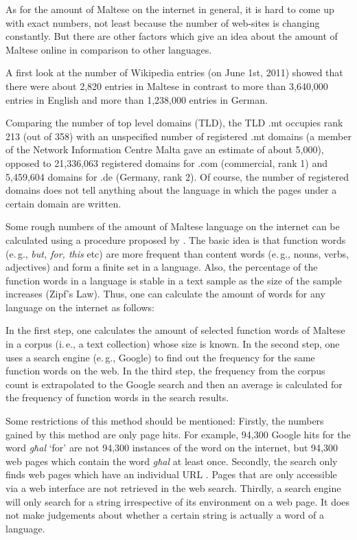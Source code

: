 \documentclass[]{../../metanetpaper}
\begin{document}
\begin{multicols}{2}
As for the amount of Maltese on the internet in general, it is hard to come up with exact numbers, not least because the number of web-sites is changing constantly. But there are other factors which give an idea about the amount of Maltese online in comparison to other languages.

A first look at the number of Wikipedia entries (on June 1st, 2011) showed that there were about 2,820 entries in Maltese in contrast to more than 3,640,000 entries in English and more than 1,238,000 entries in German.

Comparing the number of top level domains (TLD), the TLD .mt occupies rank 213 (out of 358) with an unspecified number of registered .mt domains (a member of the Network Information Centre Malta gave an estimate of about 5,000), opposed to 21,336,063 registered domains for .com (commercial, rank 1) and 5,459,604 domains for .de (Germany, rank 2). Of course, the number of registered domains does not tell anything about the language in which the pages under a certain domain are written.

Some rough numbers of the amount of Maltese language on the internet can be calculated using a procedure proposed by \cite{Kilgarriff-Grefenstette:2003,Gatt1en}. The basic idea is that function words (e.\,g., \emph{but, for, this} etc) are more frequent than content words (e.\,g., nouns, verbs, adjectives) and form a finite set in a language. Also, the percentage of the function words in a language is stable in a text sample as the size of the sample increases (Zipf's Law). Thus, one can calculate the amount of words for any language on the internet as follows: 

In the first step, one calculates the amount of selected function words of Maltese in a corpus (i.\,e., a text collection) whose size is known. In the second step, one uses a search engine (e.\,g., Google) to find out the frequency for the same function words on the web. In the third step, the frequency from the corpus count is extrapolated to the Google search and then an average is calculated for the frequency of function words in the search results.

Some restrictions of this method should be mentioned: Firstly, the numbers gained by this method are only page hits. For example, 94,300 Google hits for the word \emph{għal} `for’ are not 94,300 instances of the word on the internet, but 94,300 web pages which contain the word \emph{għal} at least once. Secondly, the search only finds web pages which have an individual URL \cite{Kilgarriff-Grefenstette:2003}. Pages that are only accessible via a web interface are not retrieved in the web search. Thirdly, a search engine will only search for a string irrespective of its environment on a web page. It does not make judgements about whether a certain string is actually a word of a language. 


\end{multicols}
\end{document}
